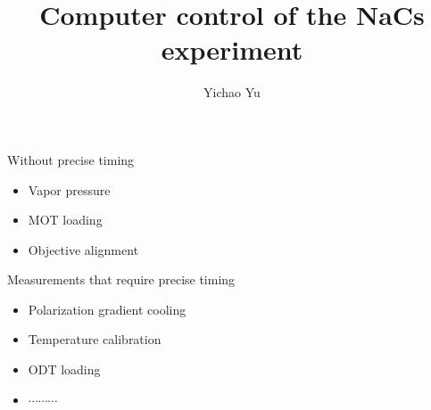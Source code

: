 \documentclass{beamer}
\title[Computer control]{Computer control of the \textbf{NaCs} experiment}
\author{Yichao Yu}
\institute{Ni Group/Harvard}
\begin{document}
\begin{frame}{}
  \titlepage
\end{frame}

\begin{frame}{}
  \begin{block}{Without precise timing}
    \begin{itemize}[<+->]
    \item
      Vapor pressure
    \item
      MOT loading
    \item
      Objective alignment
    \end{itemize}
  \end{block}
  \begin{block}{Measurements that require precise timing}
    \begin{itemize}[<+->]
    \item
      Polarization gradient cooling
    \item
      Temperature calibration
    \item
      ODT loading
    \item
      $\cdots\cdots\cdots$
    \end{itemize}
  \end{block}
\end{frame}

\begin{frame}{}
  \tableofcontents
\end{frame}

\end{document}
